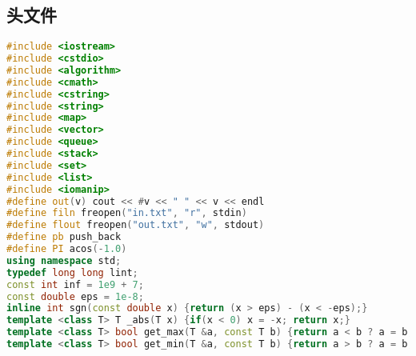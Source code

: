 \subsection{头文件}
    \begin{lstlisting}[language=c++]
#include <iostream>
#include <cstdio>
#include <algorithm>
#include <cmath>
#include <cstring>
#include <string>
#include <map>
#include <vector>
#include <queue>
#include <stack>
#include <set>
#include <list>
#include <iomanip>
#define out(v) cout << #v << " " << v << endl
#define filn freopen("in.txt", "r", stdin)
#define flout freopen("out.txt", "w", stdout)
#define pb push_back
#define PI acos(-1.0)
using namespace std;
typedef long long lint;
const int inf = 1e9 + 7;
const double eps = 1e-8;
inline int sgn(const double x) {return (x > eps) - (x < -eps);}
template <class T> T _abs(T x) {if(x < 0) x = -x; return x;}
template <class T> bool get_max(T &a, const T b) {return a < b ? a = b, true : false;}
template <class T> bool get_min(T &a, const T b) {return a > b ? a = b, true : false;}
    \end{lstlisting}
